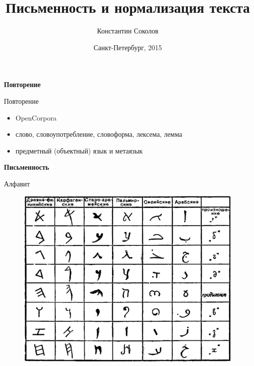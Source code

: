 \documentclass{beamer}
\begin{document}
\title{\large{\sc Письменность и нормализация текста}}
\author{Константин Соколов}
\date{Санкт-Петербург, 2015} 

\begin{frame}
    \thispagestyle{empty}
    \titlepage
\end{frame}



\begin{frame}{}
\begin{center}
	\textbf{Повторение}
\end{center}
\end{frame}

\begin{frame}{Повторение}
\setcounter{framenumber}{1}
\begin{itemize}
    \item OpenCorpora
    \item слово, словоупотребление, словоформа, лексема, лемма
    \item предметный (объектный) язык и метаязык
\end{itemize}
\end{frame}



\begin{frame}{}
\begin{center}
	\textbf{Письменность}
\end{center}
\end{frame}

\begin{frame}{Алфавит}
\begin{figure}[H]
    \includegraphics[scale=0.4]{alphabet.png} 
\end{figure}
\end{frame}
\end{document}
